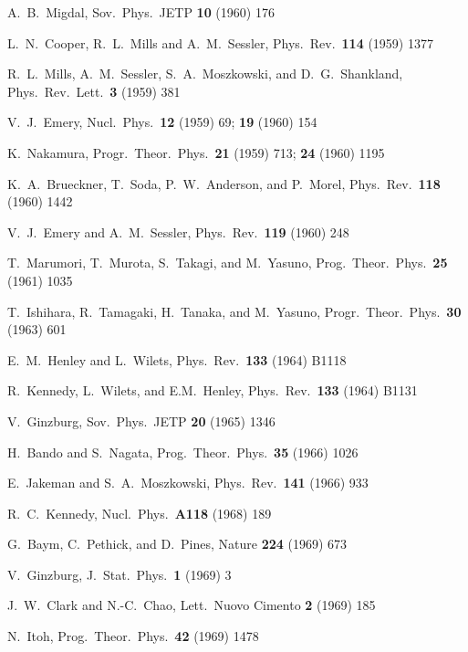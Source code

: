 \begin{thebibliography}{999}

 A.~B.~Migdal, Sov.~Phys.~JETP {\bf 10} (1960) 176

L.~N.~Cooper, R.~L.~Mills and A.~M.~Sessler, Phys.\ Rev.\ {\bf 114}
(1959) 1377

R.~L.~Mills, A.~M.~Sessler, S.~A.~Moszkowski, and D.~G.~Shankland,
Phys.\ Rev.\ Lett.\ {\bf 3} (1959) 381

V.~J.~Emery, Nucl.\ Phys.\ {\bf 12} (1959) 69; {\bf 19} (1960) 154

K.~Nakamura, Progr.\ Theor.\ Phys.\ {\bf 21} (1959) 713; {\bf 24}
(1960) 1195

K.~A.~Brueckner, T.~Soda, P.~W.~Anderson, and P.~Morel, Phys.\ Rev.\
{\bf 118} (1960) 1442

V.~J.~Emery and A.~M.~Sessler, Phys.\ Rev.\ {\bf 119} (1960) 248

T.~Marumori, T.~Murota, S.~Takagi, and M.~Yasuno, Prog.\ Theor.\ Phys.\ 
{\bf 25} (1961) 1035

T.~Ishihara, R.~Tamagaki, H.~Tanaka, and M.~Yasuno, Progr.\ Theor.\ Phys.\ 
{\bf 30} (1963) 601

\bibitem{henley}
E.~M.~Henley and L.~Wilets, Phys.\ Rev.\ {\bf 133} (1964) B1118 

 R.~Kennedy, L.~Wilets, and E.M.~Henley, Phys.\ 
Rev.\ {\bf 133} (1964) B1131

 V.~Ginzburg, Sov.~Phys.~JETP {\bf 20} (1965) 1346

\bibitem{bando}
H.~Bando and S.~Nagata, Prog.\ Theor.\ Phys.\ {\bf 35} (1966) 1026

E.~Jakeman and S.~A.~Moszkowski, Phys.\ Rev.\ {\bf 141} (1966) 933 

R.~C.~Kennedy, Nucl.\ Phys.\ {\bf A118} (1968) 189

G.~Baym, C.~Pethick, and D.~Pines, Nature {\bf 224} (1969) 673

 V.~Ginzburg, J.~Stat.~Phys.~{\bf 1} (1969) 3

\bibitem{notferro}
J.~W.~Clark and N.-C.\ Chao, Lett.\ Nuovo Cimento {\bf 2} (1969) 185

N.~Itoh, Prog.\ Theor.\ Phys.\ {\bf 42} (1969) 1478


\end{thebibliography}
